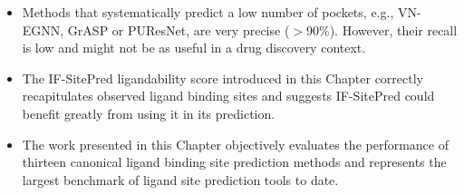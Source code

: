 \begin{itemize}
\item Methods that systematically predict a low number of pockets, e.g., VN-EGNN, GrASP or PUResNet, are very precise ($>$90\%). However, their recall is low and might not be as useful in a drug discovery context.

\item The IF-SitePred ligandability score introduced in this Chapter correctly recapitulates observed ligand binding sites and suggests IF-SitePred could benefit greatly from using it in its prediction.

\item The work presented in this Chapter objectively evaluates the performance of thirteen canonical ligand binding site prediction methods and represents the largest benchmark of ligand site prediction tools to date.

\end{itemize}
